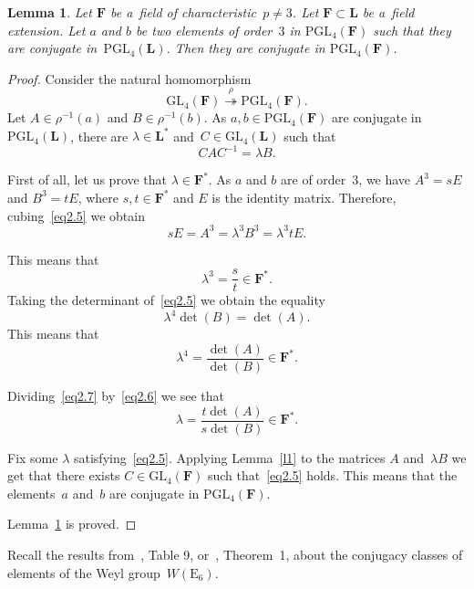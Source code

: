 \documentclass{amsart}
\numberwithin{equation}{section}
\theoremstyle{plain}
\newtheorem{lemma}{Lemma}
\theoremstyle{definition}
\theoremstyle{remark}
\begin{document}
\begin{lemma}
\label{l2}
Let $\mathbf{F}$ be a~field of characteristic~$p \neq 3$. Let $\mathbf{F} \subset \mathbf{L}$ be a~field extension. Let $a$ and $b$ be two elements of order~$3$ in $\mathrm{PGL}_4(\mathbf{F})$ such that they are conjugate in~$\mathrm{PGL}_4(\mathbf{L})$. Then they are conjugate in $\mathrm{PGL}_4(\mathbf{F})$.
\end{lemma}

\begin{proof}
Consider the natural homomorphism
$$
\mathrm{GL}_4(\mathbf{F}) \stackrel{\rho}{\twoheadrightarrow} \mathrm{PGL}_4(\mathbf{F}).
$$
Let $A \in \rho^{-1}(a)$ and $B \in \rho^{-1}(b)$. As $a, b \in \mathrm{PGL}_4(\mathbf{F})$ are conjugate
in $\mathrm{PGL}_4(\mathbf{L})$, there are $\lambda \in \mathbf{L}^*$ and~$C \in \mathrm{GL}_4(\mathbf{L})$ such that
\begin{equation}
\label{eq2.5}
CAC^{-1}=\lambda B.
\end{equation}

First of all, let us prove that $\lambda \in \mathbf{F}^*$. As $a$ and $b$ are of order~$3$, we have $A^3=sE$ and $B^3=tE$, where $s,t \in \mathbf{F}^*$ and $E$ is the identity matrix. Therefore, cubing~\eqref{eq2.5} we obtain
$$
sE=A^3=\lambda^3 B^3=\lambda^3 tE.
$$

This means that
\begin{equation}
\label{eq2.6}
\lambda^3=\frac{s}{t} \in \mathbf{F}^*.
\end{equation}
Taking the determinant of~\eqref{eq2.5} we obtain the equality
$$
 \lambda^4 \det(B)=\det(A).
$$
This means that
\begin{equation}
\label{eq2.7}
\lambda^4=\frac{\det(A)}{\det(B)} \in \mathbf{F}^*.
\end{equation}

Dividing~\eqref{eq2.7} by~\eqref{eq2.6} we see that
$$
\lambda=\frac{t\det(A)}{s\det(B)} \in \mathbf{F}^*.
$$

Fix some $\lambda$ satisfying~\eqref{eq2.5}. Applying Lemma~\ref{l1} to the matrices $A$ and~$\lambda B$ we get that there
exists $C \in \mathrm{GL}_4(\mathbf{F})$ such that~\eqref{eq2.5} holds. This means that the elements~$a$ and~$b$ are conjugate in $\mathrm{PGL}_4(\mathbf{F})$.

Lemma~\ref{l2} is proved.
\end{proof}

Recall the results from~\cite{9}, Table 9, or~\cite{17}, Theorem~1, about the conjugacy classes of elements of
 the Weyl group~$W(\mathrm{E}_6)$.
\end{document}

